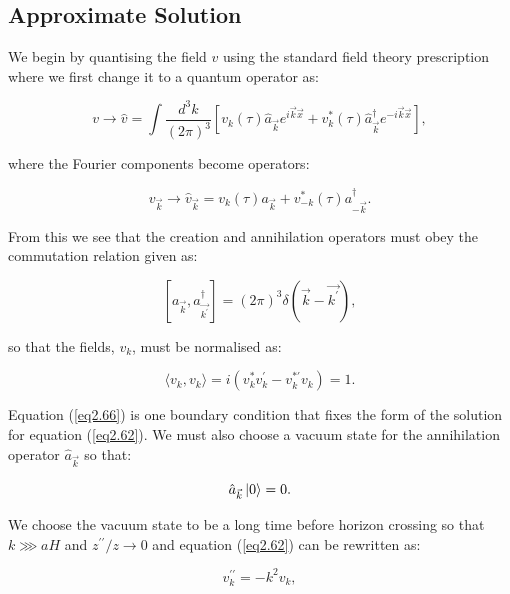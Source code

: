 \documentclass[a4paper,12pt,twoside]{report}
\begin{document}
\subsection{Approximate Solution} \label{subsec:ApproxSoluti}

We begin by quantising the field $v$ using the standard field theory prescription where we first change it to a quantum operator as:

\begin{equation} \label{eq2.63}
v \rightarrow \hat{v} = \int \frac{d^{3} k}{(2 \pi)^{3}} \left[ v_{k}(\tau)\hat{a}_{\vec{k}}e^{i\vec{k}\vec{x}} + v_{k}^{*}(\tau)\hat{a}_{\vec{k}}^{\dagger}e^{-i\vec{k} \vec{x}} \right],
\end{equation}

where the Fourier components become operators:

\begin{equation}\label{eq2.64}
v_{\vec{k}} \rightarrow \hat{v}_{\vec{k}} = v_{k}(\tau)a_{\vec{k}}  + v^{*}_{-k}(\tau)a^{\dagger}_{-\vec{k}}.
\end{equation}

From this we see that the creation and annihilation operators must obey the commutation relation given as:

\begin{equation} \label{eq2.65}
\left[a_{\vec{k}} , a^{\dagger}_{\vec{k^{\prime}}}\right] = (2\pi)^{3} \delta(\vec{k} - \vec{k^{\prime}}),
\end{equation}

so that the fields, $v_{k}$, must be normalised as:

\begin{equation} \label{eq2.66}
\langle v_{k}, v_{k} \rangle = i(v^{*}_{k}v^{\prime}_{k} - v^{* \prime}_{k}v_{k}) = 1.
\end{equation}

Equation (\ref{eq2.66}) is one boundary condition that fixes the form of the solution for equation (\ref{eq2.62}). We must also choose a vacuum state for the annihilation operator $\hat{a}_{\vec{k}}$ so that:

\begin{equation} \label{eq2.67}
\hat{a}_{\vec{k}} \ket{0} = 0.
\end{equation}

We choose the vacuum state to be a long time before horizon crossing so that $k \ggg aH$ and $z^{\prime \prime}/z \rightarrow 0$ and equation (\ref{eq2.62}) can be rewritten as:

\begin{equation} \label{eq2.68}
v_{k}^{\prime \prime} = -k^{2} v_{k},
\end{equation}
\end{document}
